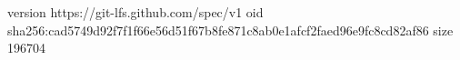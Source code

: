 version https://git-lfs.github.com/spec/v1
oid sha256:cad5749d92f7f1f66e56d51f67b8fe871c8ab0e1afcf2faed96e9fc8cd82af86
size 196704
